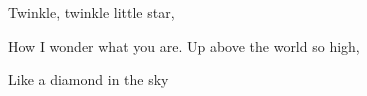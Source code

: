 Twinkle, twinkle little star,\par
How I wonder what you are.\bigskip
Up above the world so high,\par
Like a diamond in the sky\par
\bye
